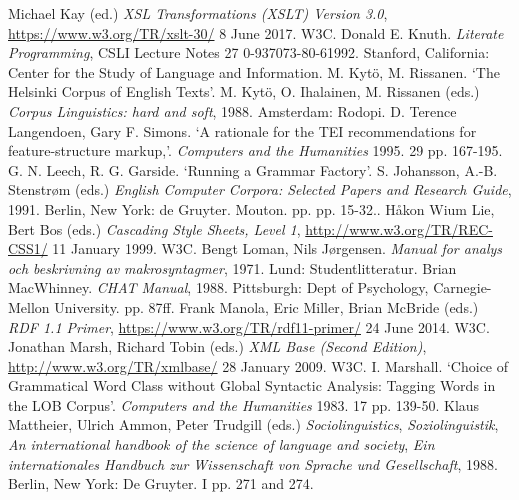 \begin{bibitemlist}{1}
\label{XSLT3}Michael Kay (ed.) \textit{XSL Transformations (XSLT) Version 3.0},  \url{https://www.w3.org/TR/xslt-30/} 8 June 2017. W3C. 
\label{KNUTH}Donald E. Knuth. \textit{Literate Programming}, CSLI Lecture Notes 27  0-937073-80-61992. Stanford, California: Center for the Study of Language and Information. 
\label{CC-BIBL-1}M. Kytö, M. Rissanen. ‘The Helsinki Corpus of English Texts’. M. Kytö, O. Ihalainen, M. Rissanen (eds.) \textit{Corpus Linguistics: hard and soft}, 1988. Amsterdam: Rodopi. 
\label{FS-BIBL-01}D. Terence Langendoen, Gary F.  Simons. ‘A rationale for the TEI recommendations for feature-structure markup,’. \textit{Computers and the Humanities} 1995. 29 pp. 167-195. 
\label{AI-BIBL-5}G. N. Leech, R. G. Garside. ‘Running a Grammar Factory’. S. Johansson, A.-B. Stenstrøm (eds.) \textit{English Computer Corpora: Selected Papers and Research Guide}, 1991. Berlin, New York: de Gruyter. Mouton. pp. pp. 15-32.. 
\label{CSS1}Håkon Wium Lie, Bert Bos (eds.) \textit{Cascading Style Sheets, Level 1},  \url{http://www.w3.org/TR/REC-CSS1/} 11 January 1999. W3C. 
\label{TS-BIBL-7}Bengt Loman, Nils Jørgensen. \textit{Manual for analys och beskrivning av makrosyntagmer}, 1971. Lund: Studentlitteratur. 
\label{TS-BIBL-4}Brian MacWhinney. \textit{CHAT Manual}, 1988. Pittsburgh: Dept of Psychology, Carnegie-Mellon University. pp. 87ff. 
\label{RDFPrimer}Frank Manola, Eric Miller, Brian McBride (eds.) \textit{RDF 1.1 Primer},  \url{https://www.w3.org/TR/rdf11-primer/} 24 June 2014. W3C. 
\label{XMLBASE}Jonathan Marsh, Richard Tobin (eds.) \textit{XML Base (Second Edition)},  \url{http://www.w3.org/TR/xmlbase/} 28 January 2009. W3C. 
\label{AI-BIBL-6}I. Marshall. ‘Choice of Grammatical Word Class without Global Syntactic Analysis: Tagging Words in the LOB Corpus’. \textit{Computers and the Humanities} 1983. 17 pp. 139-50. 
\label{CO-BIBL-1}Klaus Mattheier, Ulrich Ammon, Peter Trudgill (eds.) \textit{Sociolinguistics}, \textit{Soziolinguistik}, \textit{An international handbook of the science of language and society}, \textit{Ein internationales Handbuch zur Wissenschaft von Sprache und Gesellschaft}, 1988. Berlin, New York: De Gruyter. I pp. 271 and 274. 

\end{bibitemlist}
